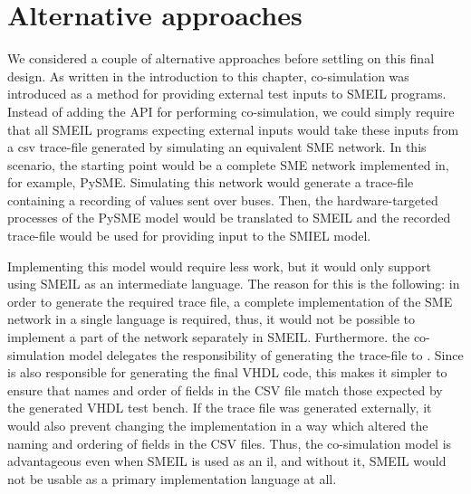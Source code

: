 \section{Alternative approaches}
We considered a couple of alternative approaches before settling on this final
design. As written in the introduction to this chapter, co-simulation was
introduced as a method for providing external test inputs to SMEIL programs.
Instead of adding the API for performing co-simulation, we could simply require
that all SMEIL programs expecting external inputs would take these inputs from a
\gls{csv} trace-file generated by simulating an equivalent SME network. In this
scenario, the starting point would be a complete SME network implemented in, for
example, PySME. Simulating this network would generate a trace-file containing a
recording of values sent over buses. Then, the hardware-targeted processes of
the PySME model would be translated to SMEIL and the recorded trace-file would
be used for providing input to the SMIEL model.

Implementing this model would require less work, but it would only support using
SMEIL as an intermediate language. The reason for this is the following: in
order to generate the required trace file, a complete implementation of the SME
network in a single language is required, thus, it would not be possible to
implement a part of the network separately in SMEIL. Furthermore. the
co-simulation model delegates the responsibility of generating the trace-file to
\libsme{}. Since \libsme{} is also responsible for generating the final VHDL
code, this makes it simpler to ensure that names and order of fields in the CSV
file match those expected by the generated VHDL test bench. If the trace file
was generated externally, it would also prevent changing the \libsme{}
implementation in a way which altered the naming and ordering of fields in the
CSV files. Thus, the co-simulation model is advantageous even when SMEIL is used
as an \gls{il}, and without it, SMEIL would not be usable as a primary
implementation language at all.


